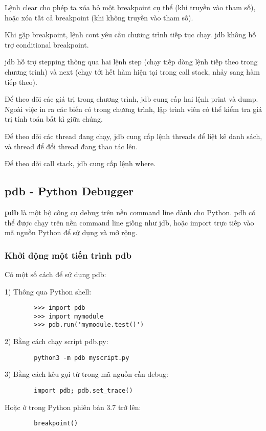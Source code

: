 \documentclass{article}
\begin{document}
    Lệnh clear cho phép ta xóa bỏ một breakpoint cụ thể (khi truyền vào tham số), hoặc xóa tất
    cả breakpoint (khi không truyền vào tham số).

    Khi gặp breakpoint, lệnh cont yêu cầu chương trình tiếp tục chạy. jdb không hỗ trợ
    conditional breakpoint.

    jdb hỗ trợ stepping thông qua hai lệnh step (chạy tiếp dòng lệnh tiếp theo trong chương trình) 
    và next (chạy tới hết hàm hiện tại trong call stack, nhảy sang hàm tiếp theo).

    Để theo dõi các giá trị trong chương trình, jdb cung cấp hai lệnh print và dump. Ngoài việc in
    ra các biến có trong chương trình, lập trình viên có thể kiểm tra giá trị tính toán bất kì giữa chúng.

    Để theo dõi các thread đang chạy, jdb cung cấp lệnh threads để liệt kê danh sách, và thread để
    đổi thread đang thao tác lên.

    Để theo dõi call stack, jdb cung cấp lệnh where.

    \subsection{pdb - Python Debugger}
    \textbf{pdb} là một bộ công cụ debug trên nền command line dành cho Python. pdb có thể được chạy
    trên nền command line giống như jdb, hoặc import trực tiếp vào mã nguồn Python để sử dụng và mở 
    rộng.

    \subsubsection{Khởi động một tiến trình pdb}
    Có một số cách để sử dụng pdb:
    
    1) Thông qua Python shell:
    \begin{verbatim}
        >>> import pdb
        >>> import mymodule
        >>> pdb.run('mymodule.test()')
    \end{verbatim}

    2) Bằng cách chạy script pdb.py:
    \begin{verbatim}
        python3 -m pdb myscript.py
    \end{verbatim}

    3) Bằng cách kêu gọi từ trong mã nguồn cần debug:
    \begin{verbatim}
        import pdb; pdb.set_trace()
    \end{verbatim}
    
    Hoặc ở trong Python phiên bản 3.7 trở lên:
    \begin{verbatim}
        breakpoint()
    \end{verbatim}
\end{document}
